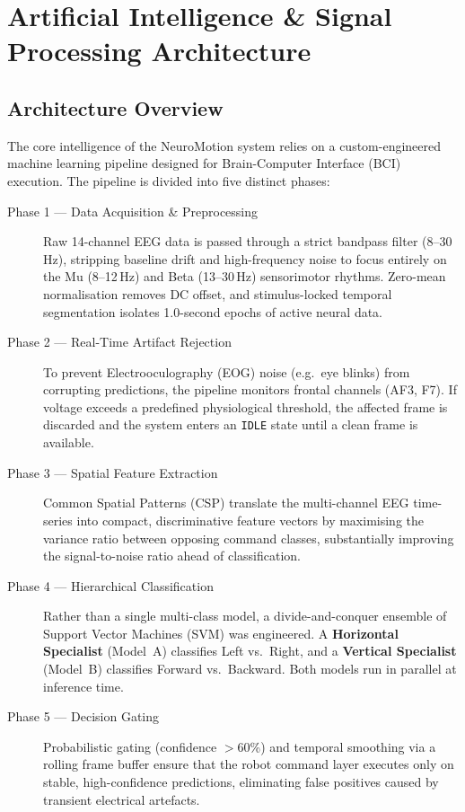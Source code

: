 \documentclass[12pt, a4paper, oneside]{report}
\begin{document}
\chapter{Artificial Intelligence \& Signal Processing Architecture}
\label{ch:signal_processing}

\section{Architecture Overview}

The core intelligence of the NeuroMotion system relies on a custom-engineered machine
learning pipeline designed for Brain-Computer Interface (BCI) execution. The pipeline is
divided into five distinct phases:

\begin{description}
    \item[Phase 1 --- Data Acquisition \& Preprocessing]
    Raw 14-channel EEG data is passed through a strict bandpass filter (8--30\,Hz),
    stripping baseline drift and high-frequency noise to focus entirely on the Mu
    (8--12\,Hz) and Beta (13--30\,Hz) sensorimotor rhythms. Zero-mean normalisation
    removes DC offset, and stimulus-locked temporal segmentation isolates 1.0-second
    epochs of active neural data.

    \item[Phase 2 --- Real-Time Artifact Rejection]
    To prevent Electrooculography (EOG) noise (e.g.\ eye blinks) from corrupting
    predictions, the pipeline monitors frontal channels (AF3, F7). If voltage exceeds a
    predefined physiological threshold, the affected frame is discarded and the system
    enters an \texttt{IDLE} state until a clean frame is available.

    \item[Phase 3 --- Spatial Feature Extraction]
    Common Spatial Patterns (CSP) translate the multi-channel EEG time-series into
    compact, discriminative feature vectors by maximising the variance ratio between
    opposing command classes, substantially improving the signal-to-noise ratio ahead
    of classification.

    \item[Phase 4 --- Hierarchical Classification]
    Rather than a single multi-class model, a divide-and-conquer ensemble of Support
    Vector Machines (SVM) was engineered. A \textbf{Horizontal Specialist} (Model~A)
    classifies Left vs.\ Right, and a \textbf{Vertical Specialist} (Model~B) classifies
    Forward vs.\ Backward. Both models run in parallel at inference time.

    \item[Phase 5 --- Decision Gating]
    Probabilistic gating (confidence $>$60\%) and temporal smoothing via a rolling
    frame buffer ensure that the robot command layer executes only on stable,
    high-confidence predictions, eliminating false positives caused by transient
    electrical artefacts.
\end{description}
\end{document}

